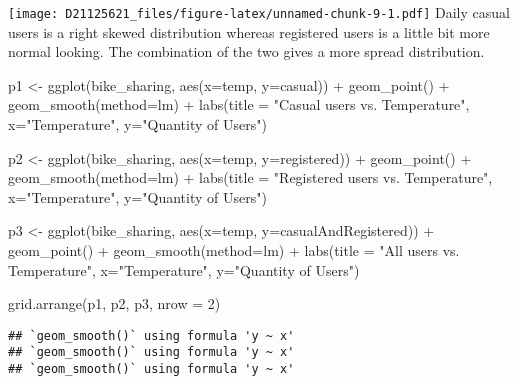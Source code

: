 \documentclass[
]{article}
\newenvironment{Shaded}{\begin{snugshade}}{\end{snugshade}}
\newcommand{\AttributeTok}[1]{\textcolor[rgb]{0.77,0.63,0.00}{#1}}
\newcommand{\DecValTok}[1]{\textcolor[rgb]{0.00,0.00,0.81}{#1}}
\newcommand{\FunctionTok}[1]{\textcolor[rgb]{0.00,0.00,0.00}{#1}}
\newcommand{\NormalTok}[1]{#1}
\newcommand{\OtherTok}[1]{\textcolor[rgb]{0.56,0.35,0.01}{#1}}
\newcommand{\SpecialCharTok}[1]{\textcolor[rgb]{0.00,0.00,0.00}{#1}}
\newcommand{\StringTok}[1]{\textcolor[rgb]{0.31,0.60,0.02}{#1}}
\begin{document}
\texttt{[image: D21125621\_files/figure-latex/unnamed-chunk-9-1.pdf]}
Daily casual users is a right skewed distribution whereas registered
users is a little bit more normal looking. The combination of the two
gives a more spread distribution.

\begin{Shaded}
\begin{Highlighting}[]
\NormalTok{p1 }\OtherTok{\textless{}{-}} \FunctionTok{ggplot}\NormalTok{(bike\_sharing, }\FunctionTok{aes}\NormalTok{(}\AttributeTok{x=}\NormalTok{temp, }\AttributeTok{y=}\NormalTok{casual)) }\SpecialCharTok{+} \FunctionTok{geom\_point}\NormalTok{() }\SpecialCharTok{+} \FunctionTok{geom\_smooth}\NormalTok{(}\AttributeTok{method=}\NormalTok{lm) }\SpecialCharTok{+} 
  \FunctionTok{labs}\NormalTok{(}\AttributeTok{title =} \StringTok{"Casual users vs. Temperature"}\NormalTok{, }\AttributeTok{x=}\StringTok{"Temperature"}\NormalTok{, }\AttributeTok{y=}\StringTok{"Quantity of Users"}\NormalTok{)}

\NormalTok{p2 }\OtherTok{\textless{}{-}} \FunctionTok{ggplot}\NormalTok{(bike\_sharing, }\FunctionTok{aes}\NormalTok{(}\AttributeTok{x=}\NormalTok{temp, }\AttributeTok{y=}\NormalTok{registered)) }\SpecialCharTok{+} \FunctionTok{geom\_point}\NormalTok{() }\SpecialCharTok{+} \FunctionTok{geom\_smooth}\NormalTok{(}\AttributeTok{method=}\NormalTok{lm) }\SpecialCharTok{+} 
  \FunctionTok{labs}\NormalTok{(}\AttributeTok{title =} \StringTok{"Registered users vs. Temperature"}\NormalTok{, }\AttributeTok{x=}\StringTok{"Temperature"}\NormalTok{, }\AttributeTok{y=}\StringTok{"Quantity of Users"}\NormalTok{)}


\NormalTok{p3 }\OtherTok{\textless{}{-}} \FunctionTok{ggplot}\NormalTok{(bike\_sharing, }\FunctionTok{aes}\NormalTok{(}\AttributeTok{x=}\NormalTok{temp, }\AttributeTok{y=}\NormalTok{casualAndRegistered)) }\SpecialCharTok{+} \FunctionTok{geom\_point}\NormalTok{() }\SpecialCharTok{+} \FunctionTok{geom\_smooth}\NormalTok{(}\AttributeTok{method=}\NormalTok{lm) }\SpecialCharTok{+} 
  \FunctionTok{labs}\NormalTok{(}\AttributeTok{title =} \StringTok{"All users vs. Temperature"}\NormalTok{, }\AttributeTok{x=}\StringTok{"Temperature"}\NormalTok{, }\AttributeTok{y=}\StringTok{"Quantity of Users"}\NormalTok{)}

\FunctionTok{grid.arrange}\NormalTok{(p1, p2, p3, }\AttributeTok{nrow =} \DecValTok{2}\NormalTok{)}
\end{Highlighting}
\end{Shaded}

\begin{verbatim}
## `geom_smooth()` using formula 'y ~ x'
## `geom_smooth()` using formula 'y ~ x'
## `geom_smooth()` using formula 'y ~ x'
\end{verbatim}
\end{document}

